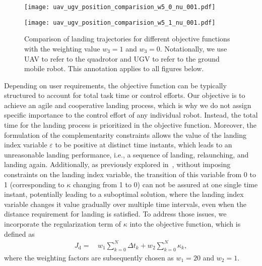 \documentclass[conference,preprint]{IEEEtran}
\begin{document}
\begin{figure*}
  \centering
  \begin{minipage}{\columnwidth}
      \centering
      \texttt{[image: uav\_ugv\_position\_comparision\_w5\_0\_nu\_001.pdf]}
      \label{fig:w5_0}
  \end{minipage}\hfill
  \begin{minipage}{\columnwidth}
      \centering
      \texttt{[image: uav\_ugv\_position\_comparision\_w5\_1\_nu\_001.pdf]}
      \label{fig:w5_1}
  \end{minipage}
  \caption{Comparison of landing trajectories for different objective functions with the weighting value $w_3=1$ and $w_3=0$. Notationally, we use UAV to refer to the quadrotor and UGV to refer to the ground mobile robot. This annotation applies to all figures below.}
  \label{fig:uav_ugv_position_comparision}
\end{figure*}

Depending on user requirements, the objective function can be typically structured to account for total task time or control efforts. 
Our objective is to achieve an agile and cooperative landing process, which is why we do not assign specific importance to the control effort of any individual robot. Instead, the total time for the landing process is prioritized in the objective function.
Moreover, the formulation of the complementarity constraints allows the value of the landing index variable $\varepsilon$ to be positive at distinct time instants, which leads to an unreasonable landing performance, i.e., a sequence of landing, relaunching, and landing again. Additionally, as previously explored in~\cite{Chen2024}, without imposing constraints on the landing index variable, the transition of this variable from 0 to 1 (corresponding to $\kappa$ changing from 1 to 0) can not be assured at one single time instant, potentially leading to a suboptimal solution, where the landing index variable changes it value gradually over multiple time intervals, even when the distance requirement for landing is satisfied. To address those issues, we incorporate the regularization term of $\kappa$ into the objective function, which is defined as
\begin{equation}
  \label{eq:objective_function}
  \begin{aligned}
  J_\text{d} =\, & w_1\sum_{k=0}^{N}\Delta t_k + w_2\sum_{k=0}^{N}\kappa_k,
  \end{aligned}
\end{equation}
where the weighting factors are subsequently chosen as $w_1=20$ and $w_2=1$.
\end{document}
